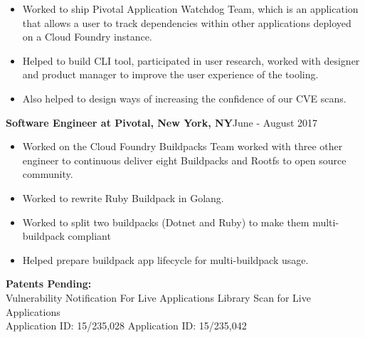 \documentclass[10pt,a4papaer]{article}
\begin{document}
{\begin{itemize}[noitemsep, topsep=0pt]
\item Worked to ship Pivotal Application Watchdog Team, which is an application that allows a user to track dependencies within other applications deployed on a Cloud Foundry instance. 
\item Helped to build CLI tool, participated in user research, worked with designer and product manager to improve the user experience of the tooling. \item Also helped to design ways of increasing the confidence of our CVE scans.\\
\end{itemize}

{\noindent\textbf{Software Engineer at Pivotal, New York, NY}}{\hfill June - August 2017}
\begin{itemize}[noitemsep, topsep=0pt]
\item Worked on the Cloud Foundry Buildpacks Team worked with three other engineer to continuous deliver eight Buildpacks and Rootfs to open source community. 
\item Worked to rewrite Ruby Buildpack in Golang.
\item Worked to split two buildpacks (Dotnet and Ruby) to make them multi-buildpack compliant
\item Helped prepare buildpack app lifecycle for multi-buildpack usage.\\

\end{itemize}

\setlength{\leftskip}{0pt}

{\noindent\textbf{Patents Pending:}\\}
Vulnerability Notification For Live Applications {\hfill Library Scan for Live Applications}\\
Application ID: 15/235,028 {\hfill Application ID: 15/235,042\qquad\quad\space}


}
\end{document}
